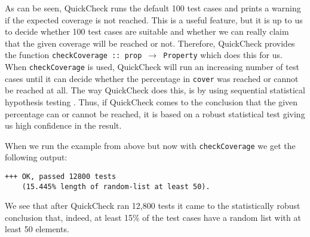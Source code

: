 As can be seen, QuickCheck runs the default 100 test cases and prints a warning if the expected coverage is not reached. This is a useful feature, but it is up to us to decide whether 100 test cases are suitable and whether we can really claim that the given coverage will be reached or not. Therefore, QuickCheck provides the function \texttt{checkCoverage :: prop $\rightarrow$ Property} which does this for us. When \texttt{checkCoverage} is used, QuickCheck will run an increasing number of test cases until it can decide whether the percentage in \texttt{cover} was reached or cannot be reached at all. The way QuickCheck does this, is by using sequential statistical hypothesis testing \cite{wald_sequential_1992}. Thus, if QuickCheck comes to the conclusion that the given percentage can or cannot be reached, it is based on a robust statistical test giving us high confidence in the result.

When we run the example from above but now with \texttt{checkCoverage} we get the following output:

\begin{footnotesize}
\begin{verbatim}
+++ OK, passed 12800 tests 
    (15.445% length of random-list at least 50).
\end{verbatim}
\end{footnotesize}

We see that after QuickCheck ran 12,800 tests it came to the statistically robust conclusion that, indeed, at least 15\% of the test cases have a random list with at least 50 elements. 